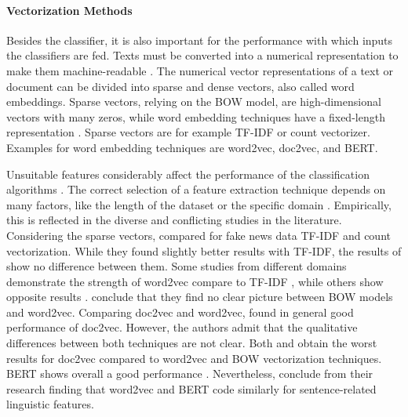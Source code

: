 \documentclass[12pt, a4paper, titlepage]{article}
\begin{document}
\paragraph{Vectorization Methods}
Besides the classifier, it is also important for the performance with which inputs the classifiers are fed. Texts must be converted into a numerical representation to make them machine-readable \citep{singh2019}. The numerical vector representations of a text or document can be divided into sparse and dense vectors, also called word embeddings. Sparse vectors, relying on the \ac{BOW} model, are high-dimensional vectors with many zeros, while word embedding techniques have a fixed-length representation \citep{almeida2019}. Sparse vectors are for example \ac{TF-IDF} or count vectorizer. Examples for word embedding techniques are word2vec, doc2vec, and \ac{BERT}. 

Unsuitable features considerably affect the performance of the classification algorithms \citep{cahyani2021}. The correct selection of a feature extraction technique depends on many factors, like the length of the dataset or the specific domain \citep{arora2021}. Empirically, this is reflected in the diverse and conflicting studies in the literature. Considering the sparse vectors, \citet{wendland2021} compared for fake news data \ac{TF-IDF} and count vectorization. While they found slightly better results with \ac{TF-IDF}, the results of \citet{WangY2017} show no difference between them. Some studies from different domains demonstrate the strength of word2vec compare to \ac{TF-IDF} \citep{arora2021, rahmawati2016}, while others show opposite results \citep{zhu2016,cahyani2021}. \citet{shao2018} conclude that they find no clear picture between \ac{BOW} models and word2vec. Comparing doc2vec and word2vec, \citet{lau2016} found in general good performance of doc2vec. However, the authors admit that the qualitative differences between both techniques are not clear. Both \citet{shao2018} and \citet{WangY2017} obtain the worst results for doc2vec compared to word2vec and \ac{BOW} vectorization techniques. \ac{BERT} shows overall a good performance \citep{gonzalez2020}. Nevertheless, \citet{miaschi2020} conclude from their research finding that word2vec and \ac{BERT} code similarly for sentence-related linguistic features.  
\end{document}
